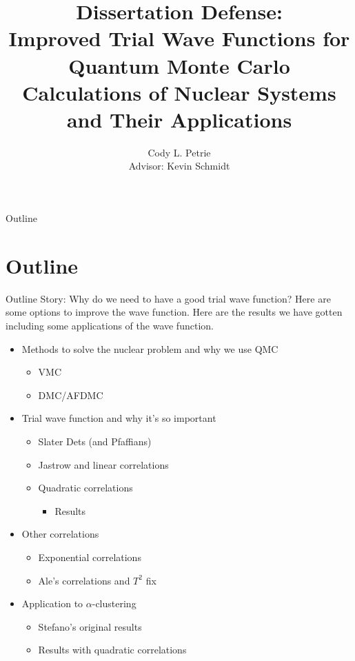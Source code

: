 \documentclass{beamer}
\title[Dissertation Defense]{{\large Dissertation Defense:}\\Improved Trial Wave Functions for Quantum Monte Carlo Calculations of Nuclear Systems and Their Applications}
\author[Cody L. Petrie]{Cody L. Petrie\\
Advisor: Kevin Schmidt}
\institute{Arizona State University}
\newcommand{\red}[1]{{\color{red}{#1}}}
\newcommand{\sfont}{9}
\newcommand{\sspace}{10.2}
\begin{document}
\begin{frame}
  \titlepage
\end{frame}

\begin{frame}{Outline}
  \tableofcontents
\end{frame}


\section{Outline}
\begin{frame}{Outline}
Story: Why do we need to have a good trial wave function? Here are some options to improve the wave function. Here are the results we have gotten including some applications of the wave function.
\begin{itemize}
   \item Methods to solve the nuclear problem and why we use QMC
   \begin{itemize}\fontsize{\sfont}{\sspace}\selectfont
      \item VMC \red{June 15}
      \item DMC/AFDMC \red{June 15}
   \end{itemize}
   \item Trial wave function and why it's so important
   \begin{itemize}\fontsize{\sfont}{\sspace}\selectfont
      \item Slater Dets (and Pfaffians) \red{June 15}
      \item Jastrow and linear correlations \red{June 15}
      \item Quadratic correlations \red{June 30}
      \begin{itemize}
         \item Results \red{June 30}
      \end{itemize}
   \end{itemize}
   \item Other correlations
   \begin{itemize}\fontsize{\sfont}{\sspace}\selectfont
      \item Exponential correlations \red{June 30}
      \item Ale's correlations and $T^2$ fix \red{July 15}
   \end{itemize}
   \item Application to $\alpha$-clustering \red{July 15}
   \begin{itemize}\fontsize{\sfont}{\sspace}\selectfont
      \item Stefano's original results \red{July 15}
      \item Results with quadratic correlations \red{July 15}
   \end{itemize}
\end{itemize}
\end{frame}
\end{document}
